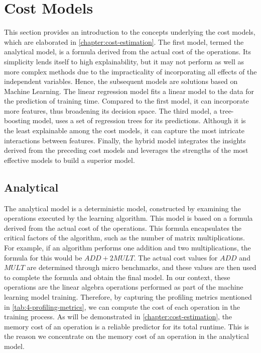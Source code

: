 \section{Cost Models}
\label{sec:4-cost-estimation}
This section provides an introduction to the concepts underlying the cost models, which are elaborated in \autoref{chapter:cost-estimation}. The first model, termed the analytical model, is a formula derived from the actual cost of the operations. Its simplicity lends itself to high explainability, but it may not perform as well as more complex methods due to the impracticality of incorporating all effects of the independent variables. Hence, the subsequent models are solutions based on Machine Learning. The linear regression model fits a linear model to the data for the prediction of training time. Compared to the first model, it can incorporate more features, thus broadening its decision space. The third model, a tree-boosting model, uses a set of regression trees for its predictions. Although it is the least explainable among the cost models, it can capture the most intricate interactions between features. Finally, the hybrid model integrates the insights derived from the preceding cost models and leverages the strengths of the most effective models to build a superior model.

\subsection{Analytical}
The analytical model is a deterministic model, constructed by examining the operations executed by the learning algorithm. This model is based on a formula derived from the actual cost of the operations. This formula encapsulates the critical factors of the algorithm, such as the number of matrix multiplications. For example, if an algorithm performs one addition and two multiplications, the formula for this would be $ADD + 2MULT$. The actual cost values for $ADD$ and $MULT$ are determined through micro benchmarks, and these values are then used to complete the formula and obtain the final model. In our context, these operations are the linear algebra operations performed as part of the machine learning model training. Therefore, by capturing the profiling metrics mentioned in \autoref{tab:4-profiling-metrics}, we can compute the cost of each operation in the training process. As will be demonstrated in \autoref{chapter:cost-estimation}, the memory cost of an operation is a reliable predictor for its total runtime. This is the reason we concentrate on the memory cost of an operation in the analytical model.

